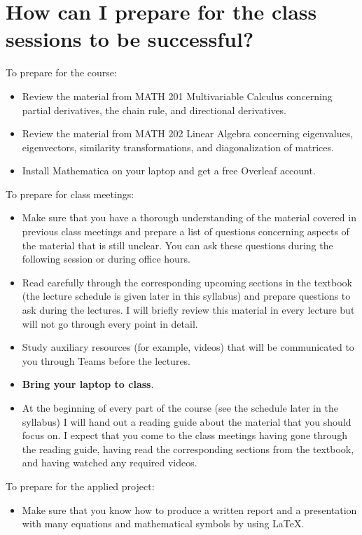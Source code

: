 \documentclass[11pt]{article}
\begin{document}

\section{How can I prepare for the class sessions to be successful?}

To prepare for the course:
\begin{itemize}[label={-},noitemsep]
\item Review the material from MATH 201 Multivariable Calculus concerning partial derivatives, the chain rule, and directional derivatives.
\item Review the material from MATH 202 Linear Algebra concerning eigenvalues, eigenvectors, similarity transformations, and diagonalization of matrices.
\item Install Mathematica on your laptop and get a free Overleaf account.
\end{itemize}

To prepare for class meetings:
\begin{itemize}[label={-},noitemsep]
\item Make sure that you have a thorough understanding of the material covered in previous class meetings and prepare a list of questions concerning aspects of the material that is still unclear. You can ask these questions during the following session or during office hours.
\item Read carefully through the corresponding upcoming sections in the textbook (the lecture schedule is given later in this syllabus) and prepare questions to ask during the lectures. I will briefly review this material in every lecture but will not go through every point in detail.  
\item Study auxiliary resources (for example, videos) that will be communicated to you through Teams before the lectures.
\item \textbf{Bring your laptop to class}.
\item At the beginning of every part of the course (see the schedule later in the syllabus) I will hand out a reading guide about the material that you should focus on. I expect that you come to the class meetings having gone through the reading guide, having read the corresponding sections from the textbook, and having watched any required videos.
\end{itemize}

To prepare for the applied project:
\begin{itemize}[label={-},noitemsep]
\item Make sure that you know how to produce a written report and a presentation with many equations and mathematical symbols by using LaTeX.
\end{itemize}
\end{document}

